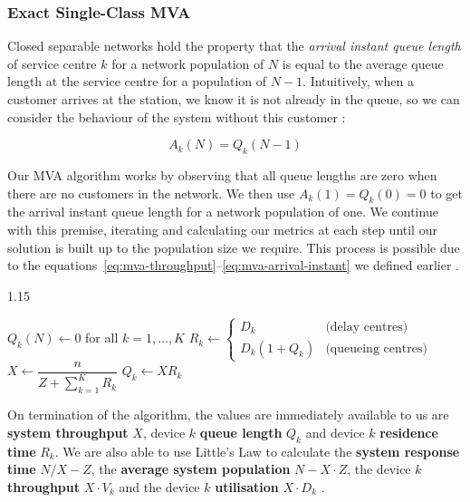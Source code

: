 \subsubsection*{Exact Single-Class MVA}

Closed separable networks hold the property that the \textit{arrival instant queue length} of service centre $k$ for a network population of $N$ is equal to the average queue length at the service centre for a population of $N - 1$. Intuitively, when a customer arrives at the station, we know it is not already in the queue, so we can consider the behaviour of the system without this customer \cite{lazowska84}:

\begin{equation}
A_k(N) = Q_k(N - 1)
\label{eq:mva-arrival-instant}
\end{equation}

Our MVA algorithm works by observing that all queue lengths are zero when there are no customers in the network. We then use $A_k(1) = Q_k(0) = 0$ to get the arrival instant queue length for a network population of one. We continue with this premise, iterating and calculating our metrics at each step until our solution is built up to the population size we require. This process is possible due to the equations~\eqref{eq:mva-throughput}–\eqref{eq:mva-arrival-instant} we defined earlier \cite{lazowska84,reiser80}.

\begin{algorithm}
\caption{Exact MVA for single-class models \cite{lazowska84}}
\begin{spacing}{1.15}
\begin{algorithmic}[1]
\State $Q_k(N) \gets 0$ for all $k = 1,\ldots,K$
    \State $R_k \gets \begin{cases}D_k & \text{(delay centres)} \\ D_k (1 + Q_k) & \text{(queueing centres)}\end{cases}$
  \EndFor
  \State $X \gets \dfrac{n}{Z + \sum_{k=1}^{K} R_k}$
    \State $Q_k \gets X R_k$
  \EndFor
\EndFor
\end{algorithmic}
\end{spacing} 
\end{algorithm}

On termination of the algorithm, the values are immediately available to us are \textbf{system throughput} $X$, device $k$ \textbf{queue length} $Q_k$ and device $k$ \textbf{residence time} $R_k$. We are also able to use Little's Law to calculate the \textbf{system response time} $N/X-Z$, the \textbf{average system population} $N-X \cdot Z$, the device $k$ \textbf{throughput} $X \cdot V_k$ and the device $k$ \textbf{utilisation} $X \cdot D_k$ \cite{lazowska84}. 

